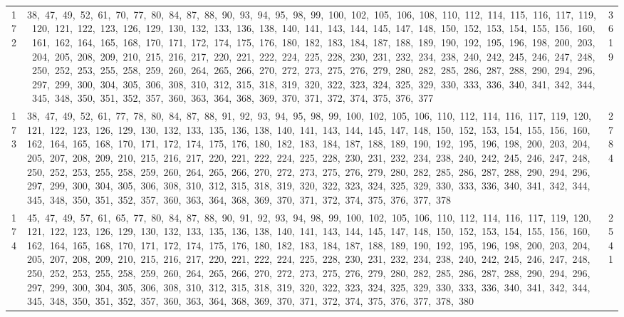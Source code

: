 \begin{longtable}{c|p{}|r}
172 & 38,\ 47,\ 49,\ 52,\ 61,\ 70,\ 77,\ 80,\ 84,\ 87,\ 88,\ 90,\ 93,\ 94,\ 95,\ 98,\ 99,\ 100,\ 102,\ 105,\ 106,\ 108,\ 110,\ 112,\ 114,\ 115,\ 116,\ 117,\ 119,\ 120,\ 121,\ 122,\ 123,\ 126,\ 129,\ 130,\ 132,\ 133,\ 136,\ 138,\ 140,\ 141,\ 143,\ 144,\ 145,\ 147,\ 148,\ 150,\ 152,\ 153,\ 154,\ 155,\ 156,\ 160,\ 161,\ 162,\ 164,\ 165,\ 168,\ 170,\ 171,\ 172,\ 174,\ 175,\ 176,\ 180,\ 182,\ 183,\ 184,\ 187,\ 188,\ 189,\ 190,\ 192,\ 195,\ 196,\ 198,\ 200,\ 203,\ 204,\ 205,\ 208,\ 209,\ 210,\ 215,\ 216,\ 217,\ 220,\ 221,\ 222,\ 224,\ 225,\ 228,\ 230,\ 231,\ 232,\ 234,\ 238,\ 240,\ 242,\ 245,\ 246,\ 247,\ 248,\ 250,\ 252,\ 253,\ 255,\ 258,\ 259,\ 260,\ 264,\ 265,\ 266,\ 270,\ 272,\ 273,\ 275,\ 276,\ 279,\ 280,\ 282,\ 285,\ 286,\ 287,\ 288,\ 290,\ 294,\ 296,\ 297,\ 299,\ 300,\ 304,\ 305,\ 306,\ 308,\ 310,\ 312,\ 315,\ 318,\ 319,\ 320,\ 322,\ 323,\ 324,\ 325,\ 329,\ 330,\ 333,\ 336,\ 340,\ 341,\ 342,\ 344,\ 345,\ 348,\ 350,\ 351,\ 352,\ 357,\ 360,\ 363,\ 364,\ 368,\ 369,\ 370,\ 371,\ 372,\ 374,\ 375,\ 376,\ 377 & 3619 \\
173 & 38,\ 47,\ 49,\ 52,\ 61,\ 77,\ 78,\ 80,\ 84,\ 87,\ 88,\ 91,\ 92,\ 93,\ 94,\ 95,\ 98,\ 99,\ 100,\ 102,\ 105,\ 106,\ 110,\ 112,\ 114,\ 116,\ 117,\ 119,\ 120,\ 121,\ 122,\ 123,\ 126,\ 129,\ 130,\ 132,\ 133,\ 135,\ 136,\ 138,\ 140,\ 141,\ 143,\ 144,\ 145,\ 147,\ 148,\ 150,\ 152,\ 153,\ 154,\ 155,\ 156,\ 160,\ 162,\ 164,\ 165,\ 168,\ 170,\ 171,\ 172,\ 174,\ 175,\ 176,\ 180,\ 182,\ 183,\ 184,\ 187,\ 188,\ 189,\ 190,\ 192,\ 195,\ 196,\ 198,\ 200,\ 203,\ 204,\ 205,\ 207,\ 208,\ 209,\ 210,\ 215,\ 216,\ 217,\ 220,\ 221,\ 222,\ 224,\ 225,\ 228,\ 230,\ 231,\ 232,\ 234,\ 238,\ 240,\ 242,\ 245,\ 246,\ 247,\ 248,\ 250,\ 252,\ 253,\ 255,\ 258,\ 259,\ 260,\ 264,\ 265,\ 266,\ 270,\ 272,\ 273,\ 275,\ 276,\ 279,\ 280,\ 282,\ 285,\ 286,\ 287,\ 288,\ 290,\ 294,\ 296,\ 297,\ 299,\ 300,\ 304,\ 305,\ 306,\ 308,\ 310,\ 312,\ 315,\ 318,\ 319,\ 320,\ 322,\ 323,\ 324,\ 325,\ 329,\ 330,\ 333,\ 336,\ 340,\ 341,\ 342,\ 344,\ 345,\ 348,\ 350,\ 351,\ 352,\ 357,\ 360,\ 363,\ 364,\ 368,\ 369,\ 370,\ 371,\ 372,\ 374,\ 375,\ 376,\ 377,\ 378 & 2784 \\
174 & 45,\ 47,\ 49,\ 57,\ 61,\ 65,\ 77,\ 80,\ 84,\ 87,\ 88,\ 90,\ 91,\ 92,\ 93,\ 94,\ 98,\ 99,\ 100,\ 102,\ 105,\ 106,\ 110,\ 112,\ 114,\ 116,\ 117,\ 119,\ 120,\ 121,\ 122,\ 123,\ 126,\ 129,\ 130,\ 132,\ 133,\ 135,\ 136,\ 138,\ 140,\ 141,\ 143,\ 144,\ 145,\ 147,\ 148,\ 150,\ 152,\ 153,\ 154,\ 155,\ 156,\ 160,\ 162,\ 164,\ 165,\ 168,\ 170,\ 171,\ 172,\ 174,\ 175,\ 176,\ 180,\ 182,\ 183,\ 184,\ 187,\ 188,\ 189,\ 190,\ 192,\ 195,\ 196,\ 198,\ 200,\ 203,\ 204,\ 205,\ 207,\ 208,\ 209,\ 210,\ 215,\ 216,\ 217,\ 220,\ 221,\ 222,\ 224,\ 225,\ 228,\ 230,\ 231,\ 232,\ 234,\ 238,\ 240,\ 242,\ 245,\ 246,\ 247,\ 248,\ 250,\ 252,\ 253,\ 255,\ 258,\ 259,\ 260,\ 264,\ 265,\ 266,\ 270,\ 272,\ 273,\ 275,\ 276,\ 279,\ 280,\ 282,\ 285,\ 286,\ 287,\ 288,\ 290,\ 294,\ 296,\ 297,\ 299,\ 300,\ 304,\ 305,\ 306,\ 308,\ 310,\ 312,\ 315,\ 318,\ 319,\ 320,\ 322,\ 323,\ 324,\ 325,\ 329,\ 330,\ 333,\ 336,\ 340,\ 341,\ 342,\ 344,\ 345,\ 348,\ 350,\ 351,\ 352,\ 357,\ 360,\ 363,\ 364,\ 368,\ 369,\ 370,\ 371,\ 372,\ 374,\ 375,\ 376,\ 377,\ 378,\ 380 & 2541 \\

\end{longtable}
